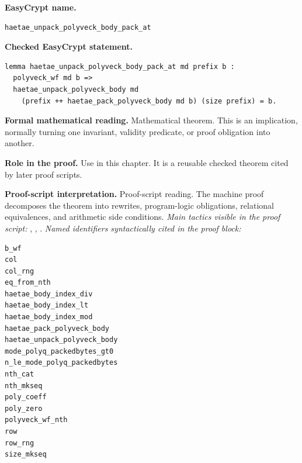 \begin{formaltheorem}
\noindent\textbf{EasyCrypt name.}
\begin{lstlisting}[language=EasyCrypt,basicstyle=\ttfamily\scriptsize]
haetae_unpack_polyveck_body_pack_at
\end{lstlisting}
\noindent\textbf{Checked EasyCrypt statement.}
\begin{lstlisting}[language=EasyCrypt,basicstyle=\ttfamily\scriptsize]
lemma haetae_unpack_polyveck_body_pack_at md prefix b :
  polyveck_wf md b =>
  haetae_unpack_polyveck_body md
    (prefix ++ haetae_pack_polyveck_body md b) (size prefix) = b.
\end{lstlisting}
\noindent\textbf{Formal mathematical reading.}
Mathematical theorem. This is an implication, normally turning one invariant, validity predicate, or proof obligation into another.

\noindent\textbf{Role in the proof.}
Use in this chapter. It is a reusable checked theorem cited by later proof scripts.

\noindent\textbf{Proof-script interpretation.}
Proof-script reading. The machine proof decomposes the theorem into rewrites, program-logic obligations, relational equivalences, and arithmetic side conditions.
\emph{Main tactics visible in the proof script:} , , .
\emph{Named identifiers syntactically cited in the proof block:}
\begin{lstlisting}[language=EasyCrypt,basicstyle=\ttfamily\scriptsize]
b_wf
col
col_rng
eq_from_nth
haetae_body_index_div
haetae_body_index_lt
haetae_body_index_mod
haetae_pack_polyveck_body
haetae_unpack_polyveck_body
mode_polyq_packedbytes_gt0
n_le_mode_polyq_packedbytes
nth_cat
nth_mkseq
poly_coeff
poly_zero
polyveck_wf_nth
row
row_rng
size_mkseq
\end{lstlisting}

\end{formaltheorem}

